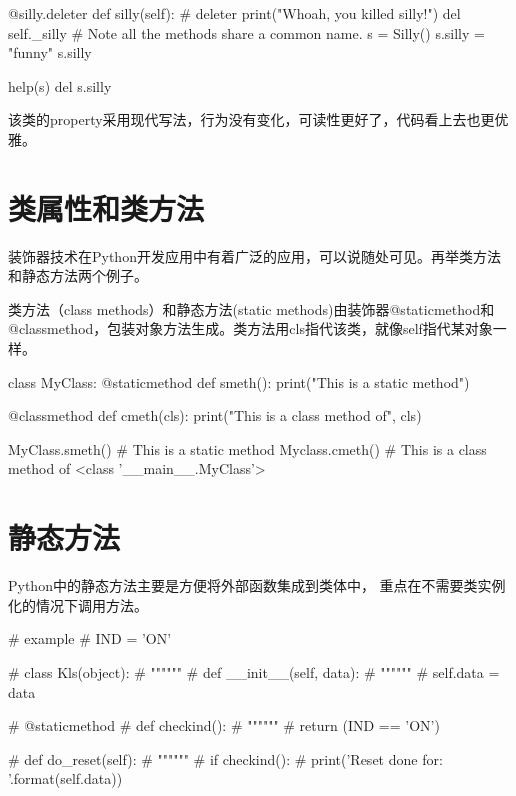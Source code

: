 \begin{python}
\begin{python}
    @silly.deleter
    def silly(self):  # deleter
        print("Whoah, you killed silly!")
        del self._silly
# Note all the methods share a common name.
s = Silly()
s.silly = "funny"
s.silly

help(s)
del s.silly
\end{python}
该类的property采用现代写法，行为没有变化，可读性更好了，代码看上去也更优雅。



\section{类属性和类方法}
装饰器技术在Python开发应用中有着广泛的应用，可以说随处可见。再举类方法和静态方法两个例子。

类方法（class methods）和静态方法(static methods)由装饰器@staticmethod和@classmethod，包装对象方法生成。类方法用cls指代该类，就像self指代某对象一样。
\begin{python}
class MyClass:
    @staticmethod
    def smeth():
        print("This is a static method")

    @classmethod
    def cmeth(cls):
        print("This is a class method of", cls)

MyClass.smeth()
# This is a static method
Myclass.cmeth()
# This is a class method of <class '__main__.MyClass'>
\end{python}
\section{静态方法}
Python中的静态方法主要是方便将外部函数集成到类体中， 重点在不需要类实例化的情况下调用方法。
\begin{python}
# example
# IND = 'ON'

# class Kls(object):
#     """"""
#     def __init__(self, data):
#         """"""
#         self.data = data

#     @staticmethod
#     def checkind():
#         """"""
#         return (IND == 'ON')

#     def do_reset(self):
#         """"""
#         if checkind():
#             print('Reset done for: {}'.format(self.data))


\end{python}
\end{python}
